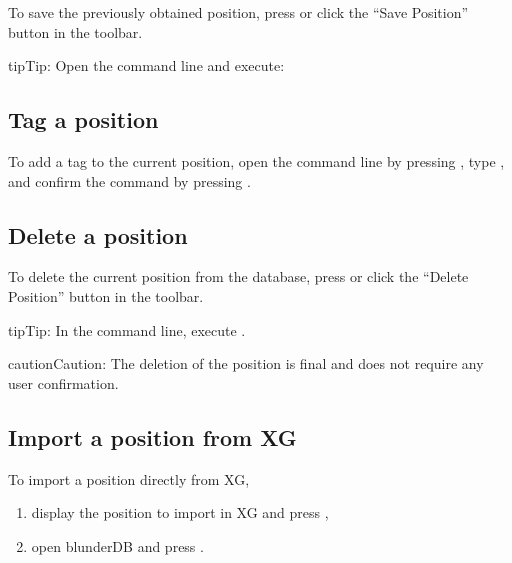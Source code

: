 \documentclass[letterpaper,10pt,english]{sphinxmanual}
\begin{document}
\sphinxAtStartPar
To save the previously obtained position, press  or click the “Save Position” button in the toolbar.

\begin{sphinxadmonition}{tip}{Tip:}
\sphinxAtStartPar
Open the command line and execute: 
\end{sphinxadmonition}


\subsection{Tag a position}
\label{\detokenize{guide_utilisateur:etiqueter-une-position}}
\sphinxAtStartPar
To add a tag  to the current position, open the command line by pressing , type , and confirm the command by pressing .


\subsection{Delete a position}
\label{\detokenize{guide_utilisateur:supprimer-une-position}}
\sphinxAtStartPar
To delete the current position from the database, press  or click the “Delete Position” button in the toolbar.

\begin{sphinxadmonition}{tip}{Tip:}
\sphinxAtStartPar
In the command line, execute .
\end{sphinxadmonition}

\begin{sphinxadmonition}{caution}{Caution:}
\sphinxAtStartPar
The deletion of the position is final and does not require any user confirmation.
\end{sphinxadmonition}


\subsection{Import a position from XG}
\label{\detokenize{guide_utilisateur:import-une-position-depuis-xg}}
\sphinxAtStartPar
To import a position directly from XG,
\begin{enumerate}
%
\item {} 
\sphinxAtStartPar
display the position to import in XG and press ,

\item {} 
\sphinxAtStartPar
open blunderDB and press .

\end{enumerate}
\end{document}
